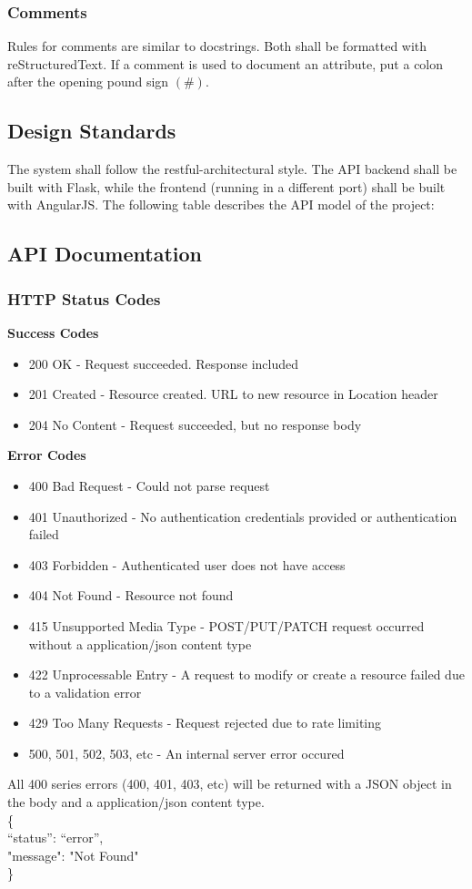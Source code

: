 \documentclass{report}
\begin{document}
\subsubsection{Comments}
Rules for comments are similar to docstrings. Both shall be formatted with reStructuredText. If a comment is used to document an attribute, put a colon after the opening pound sign $(\#)$. 

\subsection{Design Standards}
The system shall follow the restful-architectural style. The API backend shall be built with Flask, while the frontend (running in a different port) shall be built with AngularJS. The following table describes the API model of the project: 

\subsection{API Documentation}
\subsubsection{HTTP Status Codes}
\textbf{Success Codes}
\begin{itemize}
\item 200 OK - Request succeeded. Response included
\item 201 Created - Resource created. URL to new resource in Location header
\item 204 No Content - Request succeeded, but no response body
\end{itemize}
\textbf{Error Codes}
\begin{itemize}
\item 400 Bad Request - Could not parse request
\item 401 Unauthorized - No authentication credentials provided or authentication failed
\item 403 Forbidden - Authenticated user does not have access
\item 404 Not Found - Resource not found
\item 415 Unsupported Media Type - POST/PUT/PATCH request occurred without a application/json content type
\item 422 Unprocessable Entry - A request to modify or create a resource failed due to a validation error
\item 429 Too Many Requests - Request rejected due to rate limiting
\item 500, 501, 502, 503, etc - An internal server error occured
\end{itemize}
All 400 series errors (400, 401, 403, etc) will be returned with a JSON object in the body and a application/json content type.\\
\{ \\
“status”: “error”, \\
"message": "Not Found" \\
\}
\end{document}
